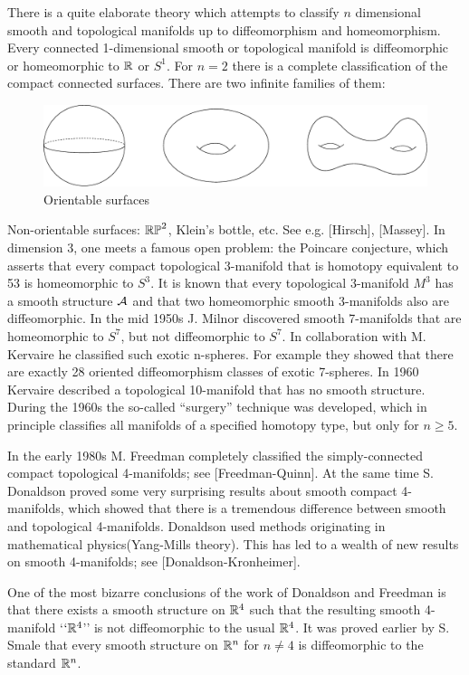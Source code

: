 \begin{remark}\label{remark:8-16}
  There is a quite elaborate theory which attempts to classify $n$
  dimensional smooth and topological manifolds up to diffeomorphism and homeomorphism. 
  Every connected 1-dimensional smooth or topological manifold is diffeomorphic or homeomorphic 
  to $\mathbb{R}$ or $S^1$. For $n = 2$ there is a complete classification of the compact connected 
  surfaces. There are two infinite families of them:

  \begin{figure}[!htb]
    \centering
    \includegraphics[width=.75\linewidth]{pics/chap8.pdf}
    \caption{Orientable surfaces}
    \label{fig:Orientable-surfaces}
  \end{figure}

  Non-orientable surfaces: $\mathbb{RP}^2$, Klein's bottle, etc. See e.g. [Hirsch], [Massey].
  In dimension 3, one meets a famous open problem: the Poincare conjecture, which
  asserts that every compact topological 3-manifold that is homotopy equivalent to
  53 is homeomorphic to $S^3$. It is known that every topological 3-manifold $M^3$
  has a smooth structure $\mathcal{A}$ and that two homeomorphic smooth 3-manifolds also
  are diffeomorphic. In the mid 1950s J. Milnor discovered smooth 7-manifolds
  that are homeomorphic to $S^7$, but not diffeomorphic to $S^7$. In collaboration with
  M. Kervaire he classified such exotic n-spheres. For example they showed that
  there are exactly 28 oriented diffeomorphism classes of exotic 7-spheres. In 1960
  Kervaire described a topological 10-manifold that has no smooth structure. During
  the 1960s the so-called ``surgery'' technique was developed, which in principle
  classifies all manifolds of a specified homotopy type, but only for $n\ge 5$.

  In the early 1980s M. Freedman completely classified the simply-connected compact 
  topological 4-manifolds; see [Freedman-Quinn]. At the same time S. Donaldson proved 
  some very surprising results about smooth compact 4-manifolds, which showed that there 
  is a tremendous difference between smooth and topological 4-manifolds. Donaldson used 
  methods originating in mathematical physics(Yang-Mills theory). This has led to a wealth of 
  new results on smooth 4-manifolds; see [Donaldson-Kronheimer].

  One of the most bizarre conclusions of the work of Donaldson and Freedman is
  that there exists a smooth structure on $\mathbb{R}^4$ such that the resulting smooth 4-manifold
  `$`\mathbb{R}^4$'' is not diffeomorphic to the usual $\mathbb{R}^4$. It was proved earlier by S. Smale that
  every smooth structure on $\mathbb{R}^n$ for $n\neq 4$ is diffeomorphic to the standard $\mathbb{R}^n$.
\end{remark}